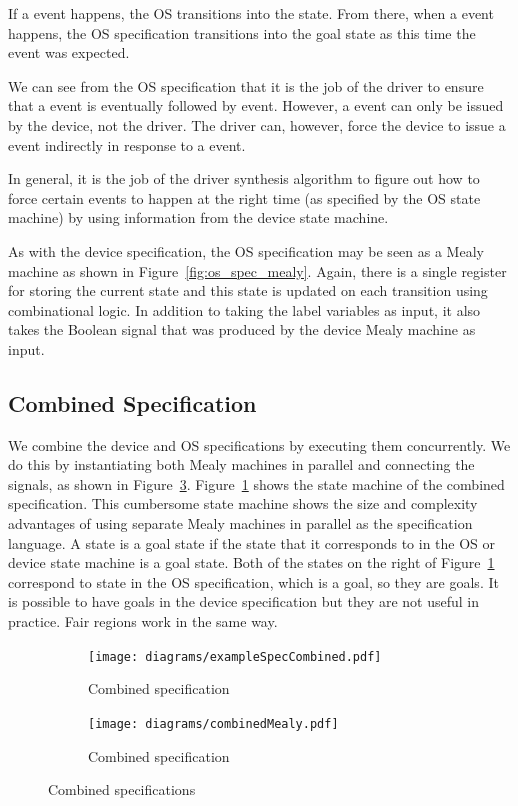 If a  event happens, the OS transitions into the  state. From there, when a  event happens, the OS specification transitions into the goal state as this time the  event was expected. 

We can see from the OS specification that it is the job of the driver to ensure that a  event is eventually followed by  event. However, a  event can only be issued by the device, not the driver. The driver can, however, force the device to issue a  event indirectly in response to a  event. 

In general, it is the job of the driver synthesis algorithm to figure out how to force certain events to happen at the right time (as specified by the OS state machine) by using information from the device state machine. 

As with the device specification, the OS specification may be seen as a Mealy machine as shown in Figure~\ref{fig:os_spec_mealy}. Again, there is a single register for storing the current state and this state is updated on each transition using combinational logic. In addition to taking the label variables as input, it also takes the  Boolean signal that was produced by the device Mealy machine as input. 

\subsection{Combined Specification}

We combine the device and OS specifications by executing them concurrently. We do this by instantiating both Mealy machines in parallel and connecting the signals, as shown in Figure~\ref{fig:combined_spec_mealy}. Figure~\ref{fig:combined_spec} shows the state machine of the combined specification. This cumbersome state machine shows the size and complexity advantages of using separate Mealy machines in parallel as the specification language. A state is a goal state if the state that it corresponds to in the OS or device state machine is a goal state. Both of the states on the right of Figure~\ref{fig:combined_spec} correspond to state  in the OS specification, which is a goal, so they are goals. It is possible to have goals in the device specification but they are not useful in practice. Fair regions work in the same way.

\begin{figure}
\centering
\begin{subfigure}[t]{0.47\textwidth}
\texttt{[image: diagrams/exampleSpecCombined.pdf]}
\caption{Combined specification}
\label{fig:combined_spec}
\end{subfigure}
\hfill
\begin{subfigure}[t]{0.47\textwidth}
\texttt{[image: diagrams/combinedMealy.pdf]}
\caption{Combined specification}
\label{fig:combined_spec_mealy}
\end{subfigure}
\caption{Combined specifications}
\end{figure}

